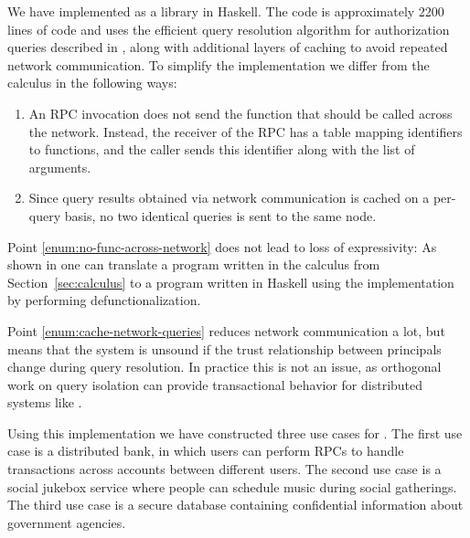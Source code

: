 We have implemented \lang{} as a library in Haskell. The code is approximately 2200 lines of code and uses the efficient query resolution algorithm for authorization queries described in \cite{Arden:2015:FA:2859845.2859998}, along with additional layers of caching to avoid repeated network communication. To simplify the implementation we differ from the calculus in the following ways:
\begin{enumerate}
    \item \label{enum:no-func-across-network} An RPC invocation does not send the function that should be called across the network. Instead, the receiver of the RPC has a table mapping identifiers to functions, and the caller sends this identifier along with the list of arguments.
    \item \label{enum:cache-network-queries} Since query results obtained via network communication is cached on a per-query basis, no two identical queries is sent to the same node.
\end{enumerate}

Point \ref{enum:no-func-across-network} does not lead to loss of expressivity: As shown in \cite{Cooper:2009:RC:1599410.1599439} one can translate a program written in the calculus from Section~\ref{sec:calculus} to a program written in Haskell using the \lang{} implementation by performing defunctionalization.

Point \ref{enum:cache-network-queries} reduces network communication a lot, but means that the system is unsound if the trust relationship between principals change during query resolution. In practice this is not an issue, as orthogonal work on query isolation \cite{Liu:2009:FPS:1629575.1629606} can provide transactional behavior for distributed systems like \lang.


Using this implementation we have constructed three use cases for \lang. The first use case is a distributed bank, in which users can perform RPCs to handle transactions across accounts between different users. The second use case is a social jukebox service \cite{Sprague:2008:MSU:1385569.1385652} where people can schedule music during social gatherings. The third use case is a secure database containing confidential information about government agencies.

